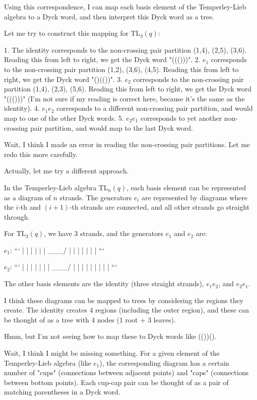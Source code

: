 \documentclass[12p]{article}
\newcounter{reasoningcounter}
\newenvironment{reasoning}[1][]
{\refstepcounter{reasoningcounter}%
\begin{tcolorbox}[
    title=Reasoning \thereasoningcounter: #1,
    colback=white, %
    colframe=gray,
    coltext=black, %
    fonttitle=\bfseries\normalsize,
    top=2mm,
    bottom=2mm,
    enlarge top initially by=5mm
]
\small
}
{\end{tcolorbox}}
\begin{document}
\begin{reasoning}
Using this correspondence, I can map each basis element of the Temperley-Lieb algebra to a Dyck word, and then interpret this Dyck word as a tree.

Let me try to construct this mapping for $\text{TL}_3(q)$:

1. The identity corresponds to the non-crossing pair partition {(1,4), (2,5), (3,6)}. Reading this from left to right, we get the Dyck word "((()))".
2. $e_1$ corresponds to the non-crossing pair partition {(1,2), (3,6), (4,5)}. Reading this from left to right, we get the Dyck word "()(())".
3. $e_2$ corresponds to the non-crossing pair partition {(1,4), (2,3), (5,6)}. Reading this from left to right, we get the Dyck word "((()))" (I'm not sure if my reading is correct here, because it's the same as the identity).
4. $e_1 e_2$ corresponds to a different non-crossing pair partition, and would map to one of the other Dyck words.
5. $e_2 e_1$ corresponds to yet another non-crossing pair partition, and would map to the last Dyck word.

Wait, I think I made an error in reading the non-crossing pair partitions. Let me redo this more carefully.

Actually, let me try a different approach.

In the Temperley-Lieb algebra $\text{TL}_n(q)$, each basis element can be represented as a diagram of $n$ strands. The generators $e_i$ are represented by diagrams where the $i$-th and $(i+1)$-th strands are connected, and all other strands go straight through.

For $\text{TL}_3(q)$, we have 3 strands, and the generators $e_1$ and $e_2$ are:

$e_1$:
```
|     |     |
|     |     |
 \___/      |
      |     |
      |     |
      |     |
```

$e_2$:
```
|     |     |
|     |     |
|      \___/
|     |     |
|     |     |
|     |     |
```

The other basis elements are the identity (three straight strands), $e_1 e_2$, and $e_2 e_1$.

I think these diagrams can be mapped to trees by considering the regions they create. The identity creates 4 regions (including the outer region), and these can be thought of as a tree with 4 nodes (1 root + 3 leaves).

Hmm, but I'm not seeing how to map these to Dyck words like (())().

Wait, I think I might be missing something. For a given element of the Temperley-Lieb algebra (like $e_1$), the corresponding diagram has a certain number of "cups" (connections between adjacent points) and "caps" (connections between bottom points). Each cup-cap pair can be thought of as a pair of matching parentheses in a Dyck word.


\end{reasoning}
\end{document}
